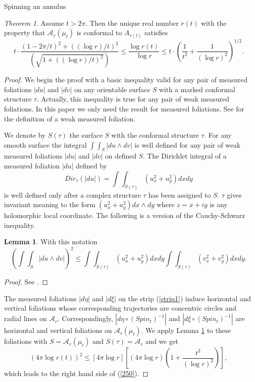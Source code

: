 \documentclass[12pt]{amsart}
\theoremstyle{remark}
\newtheorem{theorem}{Theorem}
\theoremstyle{definition}
\theoremstyle{definition}
\newtheorem{lemma}{Lemma}
\begin{document}
\begin{section}{Spinning an annulus}
\begin{theorem}\label{thm4} Assume $t>2 \pi.$ Then the unique real number $r(t)$ with the property that ${\mathcal A}_r(\mu_t)$ is conformal to $A_{r(t)}$ satisfies 
    \begin{equation}\label{250}
    t \cdot \frac{(1-2\pi/t)^2+ ((\log r)/t)^2}{(\sqrt{1+ ((\log r)/t)^2})} \leq \frac{\log r(t)}{\log r} 
   \leq 
   t \cdot \left(\frac{1}{t^2} + \frac{1}{(\log r)^2}\right)^{1/2}.
   \end{equation}

\end{theorem}
\begin{proof}
We begin the proof with a basic inequality valid for any pair of measured foliations 
$|du|$ and $|dv|$ 
on any orientable surface $S$ with a marked conformal structure $\tau.$
Actually, this inequality is true for any pair of weak measured foliations. In this paper we only need the result for measured foliations.  See \cite{Gardiner7}
for the definition of a weak measured foliation.

We denote by $S(\tau)$ the surface $S$ with the conformal structure $\tau.$  
For any smooth surface the integral $\int\!\int_S |du \wedge dv|$ is well defined for any pair of weak measured foliations $|du|$ and $|dv|$ on defined $S.$  The Dirichlet integral of a measured foliation 
$|du|$ defined by
 $$Dir_{\tau}(|du|)= \int \! \int_{S(\tau)} (u_x^2+u_y^2) dx dy$$
 is well defined only after a complex structure $\tau$ has been assigned to $S.$ $\tau$ gives invariant meaning to the form $(u_x^2 + u_y^2)dx \wedge dy$ where $z=x + i y$ is any holomorphic local coordinate.
 The following is a version of the Cauchy-Schwarz inequality.
\begin{lemma}\label{Five}  With this notation
\begin{equation}\label{thirtyone}
\left(\int \! \int_S |du \wedge dv|\right)^2  \leq \int\!\int_{S(\tau)}(u_x^2+u_y^2) dxdy  \int\!\int_{S(\tau)}(v_x^2+v_y^2)dxdy.
\end{equation}
\end{lemma}
\begin{proof}See \cite{Gardiner7}.
      \end{proof}

The measured foliations $|d\eta|$ and $|d\xi|$ on the strip (\ref{strip1}) induce horizontal and vertical foliations whose corresponding trajectories are concentric circles and radial lines on ${\mathcal A}_r.$  Correspondingly,
$|d\eta\circ (Spin_t)^{-1}|$ and $|d\xi \circ (Spin_t)^{-1}|$ are horizontal and vertical foliations on ${\mathcal A}_r(\mu_t).$  We apply Lemma \ref{Five} to these foliations 
with $S={\mathcal A}_r(\mu_t)$ and $S(\tau)={\mathcal A}_r$ and we get
$$(4 \pi \log r(t))^2 \leq 
\left[4 \pi \log r\right]\left[(4 \pi \log r)(1 + \frac{t^2}{(\log r)^2})\right],$$
which leads to the right hand side of (\ref{250}).


\end{proof}
\end{section}
\end{document}
